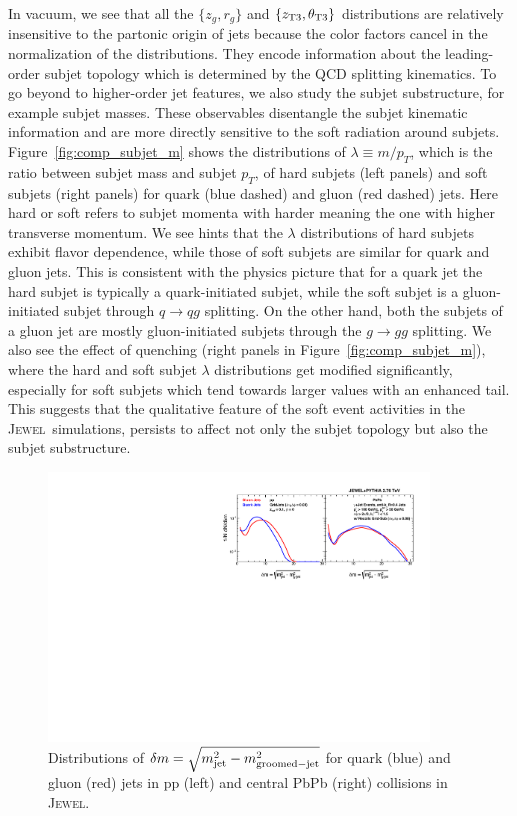 \documentclass[notoc,preprintnumbers]{JHEP3}
\newcommand{\jw}{\textsc{Jewel}~}
\begin{document}
In vacuum, we see that all the $\{z_g,r_g\}$ and $\{z_{\rm T3},\theta_{\rm T3}\}$ distributions are relatively insensitive to the partonic origin of jets because the color factors cancel in the normalization of the distributions. They encode information about the leading-order subjet topology which is determined by the QCD splitting kinematics. To go beyond to higher-order jet features, we also study the subjet substructure, for example subjet masses. These observables disentangle the subjet kinematic information and are more directly sensitive to the soft radiation around subjets. Figure~\ref{fig:comp_subjet_m} shows the distributions of $\lambda\equiv m/p_T$, which is the ratio between subjet mass and subjet $p_T$, of hard subjets (left panels) and soft subjets (right panels) for quark (blue dashed) and gluon (red dashed) jets. Here hard or soft refers to subjet momenta with harder meaning the one with higher transverse momentum. We see hints that the $\lambda$ distributions of hard subjets exhibit flavor dependence, while those of soft subjets are similar for quark and gluon jets. This is consistent with the physics picture that for a quark jet the hard subjet is typically a quark-initiated subjet, while the soft subjet is a gluon-initiated subjet through $q\rightarrow qg$ splitting. On the other hand, both the subjets of a gluon jet are mostly gluon-initiated subjets through the $g\rightarrow gg$ splitting. We also see the effect of quenching (right panels in Figure~\ref{fig:comp_subjet_m}), where the hard and soft subjet $\lambda$ distributions get modified significantly, especially for soft subjets which tend towards larger values with an enhanced tail. This suggests that the qualitative feature of the soft event activities in the \jw simulations, persists to affect not only the subjet topology but also the subjet substructure.

\begin{figure}[t]
	   \centering
	   \includegraphics[width=0.9\textwidth]{plots/Comp_delta_m2.pdf}
	   \caption{Distributions of $\delta m=\sqrt{m_{\rm jet}^2-m_{\rm groomed-jet}^2}$ for quark (blue) and gluon (red) jets in pp (left) and central PbPb (right) collisions in \textsc{Jewel}.}
\label{fig:comp_delta_m2}
\end{figure}
\end{document}
